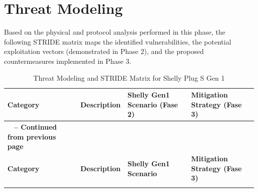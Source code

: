 \section{Threat Modeling}
Based on the physical and protocol analysis performed in this phase, the following STRIDE matrix maps the identified vulnerabilities, the potential exploitation vectors (demonstrated in Phase 2), and the proposed countermeasures implemented in Phase 3.

\begingroup
\footnotesize
\renewcommand{\arraystretch}{1.3}
\setlength{\tabcolsep}{4pt} %
\begin{longtable}{>{\raggedright\arraybackslash}p{} >{\raggedright\arraybackslash}p{} >{\raggedright\arraybackslash}p{} >{\raggedright\arraybackslash}p{}}
\caption{Threat Modeling and STRIDE Matrix for Shelly Plug S Gen 1} \label{tab:stride_matrix} \\
\toprule
\textbf{\color{darkblue}Category} & \textbf{\color{darkblue}Description} & \textbf{\color{darkblue}Shelly Gen1 Scenario (Fase 2)} & \textbf{\color{darkblue}Mitigation Strategy (Fase 3)} \\
\midrule
\endfirsthead

\multicolumn{4}{c}%
{{\bfseries \tablename\ \thetable{} -- Continued from previous page}} \\
\toprule
\textbf{\color{darkblue}Category} & \textbf{\color{darkblue}Description} & \textbf{\color{darkblue}Shelly Gen1 Scenario} & \textbf{\color{darkblue}Mitigation Strategy (Fase 3)} \\
\midrule
\endhead

\bottomrule
\endfoot

\bottomrule
\endlastfoot


\end{longtable}

